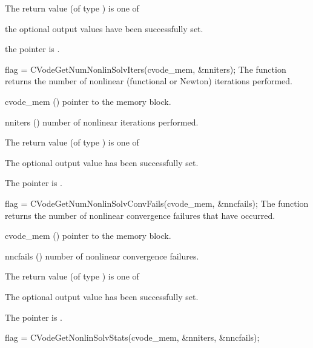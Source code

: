 {
  The return value  (of type ) is one of
  \begin{args}
  \item[\Id{CV\_SUCCESS}] 
    the optional output values have been successfully set.
  \item[\Id{CV\_MEM\_NULL}]
    the  pointer is .
  \end{args}
}
{}
{
  flag = CVodeGetNumNonlinSolvIters(cvode\_mem, \&nniters);
}
{
  The function  returns the
  number of nonlinear (functional or Newton) iterations performed. 
}
{
  \begin{args}
  \item[cvode\_mem] ()
    pointer to the {\cvode} memory block.
  \item[nniters] ()
    number of nonlinear iterations performed.
  \end{args}
}
{
  The return value  (of type ) is one of
  \begin{args}
  \item[\Id{CV\_SUCCESS}] 
    The optional output value has been successfully set.
  \item[\Id{CV\_MEM\_NULL}]
    The  pointer is .
  \end{args}
}
{}
{
  flag = CVodeGetNumNonlinSolvConvFails(cvode\_mem, \&nncfails);
}
{
  The function  returns the
  number of nonlinear convergence failures that have occurred.
}
{
  \begin{args}
  \item[cvode\_mem] ()
    pointer to the {\cvode} memory block.
  \item[nncfails] ()
    number of nonlinear convergence failures.
  \end{args}
}
{
  The return value  (of type ) is one of
  \begin{args}
  \item[\Id{CV\_SUCCESS}] 
    The optional output value has been successfully set.
  \item[\Id{CV\_MEM\_NULL}]
    The  pointer is .
  \end{args}
}
{}
{
  flag = CVodeGetNonlinSolvStats(cvode\_mem, \&nniters, \&nncfails);
}

